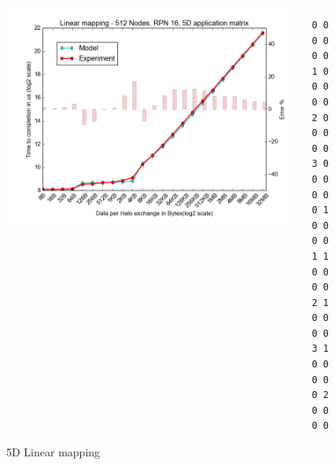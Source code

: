 \documentclass{beamer}
\begin{document}
\begin{frame}[fragile]
\begin{figure}
\caption{5D Linear mapping}
\begin{columns}
  \begin{column}{0.6\textwidth}
    \includegraphics[width=1\textwidth]{../mappings/5d_linear_model.png}
  \end{column}
  \begin{column}{0.3\textwidth}
\lstset{title=Mapping sample}
\begin{lstlisting}[basicstyle=\footnotesize\ttfamily, frame=lines,columns=fixed]
0 0 0 0 0 0
1 0 0 0 0 0
2 0 0 0 0 0
3 0 0 0 0 0
0 1 0 0 0 0
1 1 0 0 0 0
2 1 0 0 0 0
3 1 0 0 0 0
0 2 0 0 0 0
\end{lstlisting}
  \end{column}

\end{columns}
\end{figure}
\end{frame}
\end{document}
